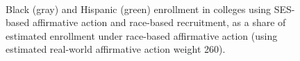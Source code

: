 \begin{figure}
  \centering
   \\
  \caption{Black (\colorbox{sns-gray}{gray}) and Hispanic (\colorbox{sns-green}{green}) enrollment in colleges using SES-based affirmative action and race-based recruitment, as a share of estimated enrollment under race-based affirmative action (using estimated real-world affirmative action weight 260).}
  \label{fig:2}
\end{figure}

